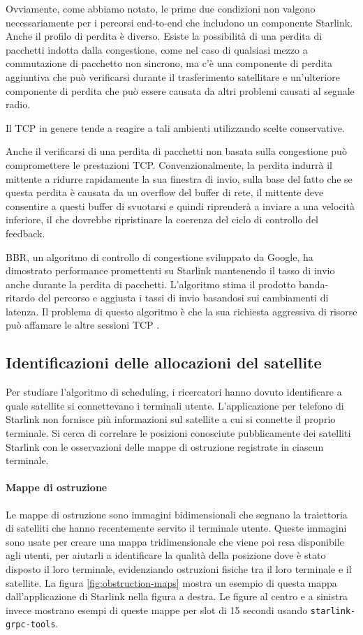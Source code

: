 Ovviamente, come abbiamo notato, le prime due condizioni non valgono necessariamente per i percorsi end-to-end che includono un componente Starlink.
Anche il profilo di perdita è diverso.
Esiste la possibilità di una perdita di pacchetti indotta dalla congestione, come nel caso di qualsiasi mezzo a commutazione di pacchetto non sincrono, ma c'è una componente di perdita aggiuntiva che può verificarsi durante il trasferimento satellitare e un'ulteriore componente di perdita che può essere causata da altri problemi causati al segnale radio.

Il TCP in genere tende a reagire a tali ambienti utilizzando scelte conservative.

Anche il verificarsi di una perdita di pacchetti non basata sulla congestione può compromettere le prestazioni TCP. Convenzionalmente, la perdita indurrà il mittente a ridurre rapidamente la sua finestra di invio, sulla base del fatto che se questa perdita è causata da un overflow del buffer di rete, il mittente deve consentire a questi buffer di svuotarsi e quindi riprenderà a inviare a una velocità inferiore, il che dovrebbe ripristinare la coerenza del ciclo di controllo del feedback.

BBR, un algoritmo di controllo di congestione sviluppato da Google, ha dimostrato performance promettenti su Starlink mantenendo il tasso di invio anche durante la perdita di pacchetti.
L'algoritmo stima il prodotto banda-ritardo del percorso e aggiusta i tassi di invio basandosi sui cambiamenti di latenza.
Il problema di questo algoritmo è che la sua richiesta aggressiva di risorse può affamare le altre sessioni TCP \cite{geoff_huston_transport_2024}.

\subsection{Identificazioni delle allocazioni del satellite}
Per studiare l'algoritmo di scheduling, i ricercatori hanno dovuto identificare a quale satellite si connettevano i terminali utente.
L'applicazione per telefono di Starlink non fornisce più informazioni sul satellite a cui si connette il proprio terminale.
Si cerca di correlare le posizioni conosciute pubblicamente dei satelliti Starlink con le osservazioni delle mappe di ostruzione registrate in ciascun terminale.

\paragraph{Mappe di ostruzione}
Le mappe di ostruzione sono immagini bidimensionali che segnano la traiettoria di satelliti che hanno recentemente servito il terminale utente.
Queste immagini sono usate per creare una mappa tridimensionale che viene poi resa disponibile agli utenti, per aiutarli a identificare la qualità della posizione dove è stato disposto il loro terminale, evidenziando ostruzioni fisiche tra il loro terminale e il satellite.
La figura \ref{fig:obstruction-maps} mostra un esempio di questa mappa dall'applicazione di Starlink nella figura a destra.
Le figure al centro e a sinistra invece mostrano esempi di queste mappe per slot di 15 secondi usando \verb|starlink-grpc-tools|\cite{sparky8512_starlink-grpc-tools_nodate}.

